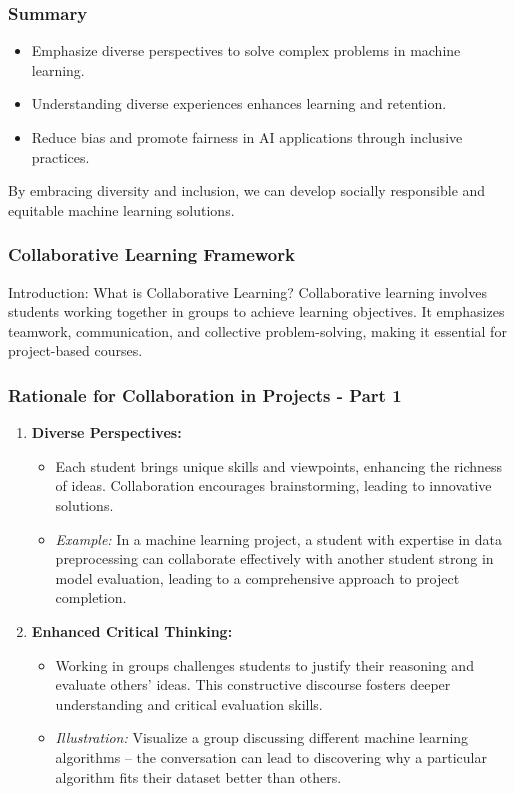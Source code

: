 \documentclass[aspectratio=169]{beamer}
\begin{document}
\begin{frame}[fragile]
    \frametitle{Summary}
    \begin{itemize}
        \item Emphasize diverse perspectives to solve complex problems in machine learning.
        \item Understanding diverse experiences enhances learning and retention.
        \item Reduce bias and promote fairness in AI applications through inclusive practices.
    \end{itemize}
    \pause
    By embracing diversity and inclusion, we can develop socially responsible and equitable machine learning solutions.
\end{frame}

\begin{frame}[fragile]
    \frametitle{Collaborative Learning Framework}
    \begin{block}{Introduction: What is Collaborative Learning?}
        Collaborative learning involves students working together in groups to achieve learning objectives. It emphasizes teamwork, communication, and collective problem-solving, making it essential for project-based courses.
    \end{block}
\end{frame}

\begin{frame}[fragile]
    \frametitle{Rationale for Collaboration in Projects - Part 1}
    \begin{enumerate}
        \item \textbf{Diverse Perspectives:}
        \begin{itemize}
            \item Each student brings unique skills and viewpoints, enhancing the richness of ideas. Collaboration encourages brainstorming, leading to innovative solutions.
            \item \textit{Example:} In a machine learning project, a student with expertise in data preprocessing can collaborate effectively with another student strong in model evaluation, leading to a comprehensive approach to project completion.
        \end{itemize}
        
        \item \textbf{Enhanced Critical Thinking:}
        \begin{itemize}
            \item Working in groups challenges students to justify their reasoning and evaluate others’ ideas. This constructive discourse fosters deeper understanding and critical evaluation skills.
            \item \textit{Illustration:} Visualize a group discussing different machine learning algorithms – the conversation can lead to discovering why a particular algorithm fits their dataset better than others.
        \end{itemize}
    \end{enumerate}
\end{frame}
\end{document}
